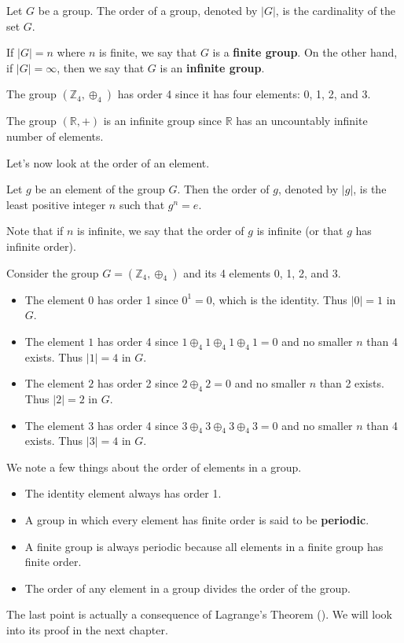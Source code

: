 \begin{definition}
    Let $G$ be a group. The order of a group, denoted by $|G|$, is the cardinality of the set $G$.
\end{definition}

If $|G| = n$ where $n$ is finite, we say that $G$ is a \textbf{finite group}. On the other hand, if $|G| = \infty$, then we say that $G$ is an \textbf{infinite group}.

\begin{example}
    The group $(\mathbb{Z}_4, \oplus_4)$ has order 4 since it has four elements: 0, 1, 2, and 3.
\end{example}

\begin{example}
    The group $(\mathbb{R}, +)$ is an infinite group since $\mathbb{R}$ has an uncountably infinite number of elements.
\end{example}

Let's now look at the order of an element.
\begin{definition}
    Let $g$ be an element of the group $G$. Then the order of $g$, denoted by $|g|$, is the least positive integer $n$ such that $g^n = e$.
\end{definition}
Note that if $n$ is infinite, we say that the order of $g$ is infinite (or that $g$ has infinite order).

\begin{example}
    Consider the group $G = (\mathbb{Z}_4, \oplus_4)$ and its 4 elements 0, 1, 2, and 3.
    \begin{itemize}
        \item The element $0$ has order 1 since $0^1 = 0$, which is the identity. Thus $|0| = 1$ in $G$.
        \item The element $1$ has order 4 since $1 \oplus_4 1 \oplus_4 1 \oplus_4 1 = 0$ and no smaller $n$ than 4 exists. Thus $|1| = 4$ in $G$.
        \item The element $2$ has order 2 since $2 \oplus_4 2 = 0$ and no smaller $n$ than 2 exists. Thus $|2| = 2$ in $G$.
        \item The element $3$ has order 4 since $3 \oplus_4 3 \oplus_4 3 \oplus_4 3 = 0$ and no smaller $n$ than 4 exists. Thus $|3| = 4$ in $G$.
    \end{itemize}
\end{example}

We note a few things about the order of elements in a group.
\begin{itemize}
    \item The identity element always has order 1.
    \item A group in which every element has finite order is said to be \textbf{periodic}.
    \item A finite group is always periodic because all elements in a finite group has finite order.
    \item The order of any element in a group divides the order of the group.
\end{itemize}
The last point is actually a consequence of Lagrange's Theorem (). We will look into its proof in the next chapter.

